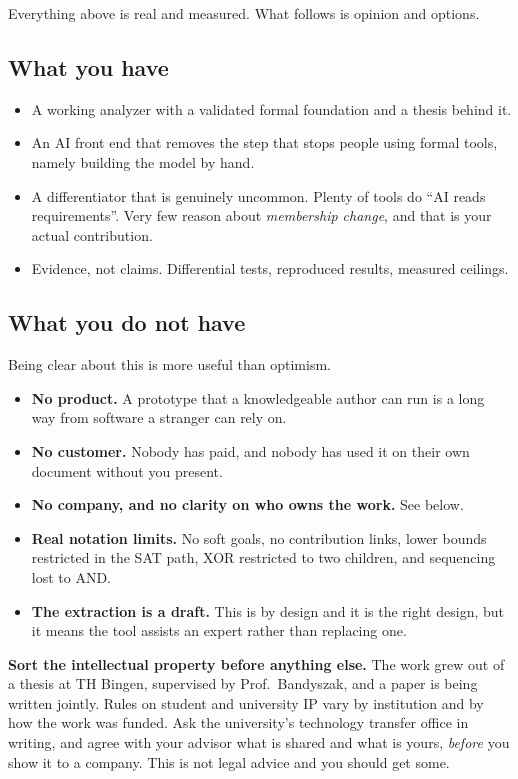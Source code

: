 \documentclass[11pt,a4paper]{article}
\begin{document}
Everything above is real and measured. What follows is opinion and options.

\subsection{What you have}

\begin{itemize}
\item A working analyzer with a validated formal foundation and a thesis behind it.
\item An AI front end that removes the step that stops people using formal tools, namely
      building the model by hand.
\item A differentiator that is genuinely uncommon. Plenty of tools do ``AI reads
      requirements''. Very few reason about \emph{membership change}, and that is your
      actual contribution.
\item Evidence, not claims. Differential tests, reproduced results, measured ceilings.
\end{itemize}

\subsection{What you do not have}

Being clear about this is more useful than optimism.

\begin{itemize}
\item \textbf{No product.} A prototype that a knowledgeable author can run is a long way
      from software a stranger can rely on.
\item \textbf{No customer.} Nobody has paid, and nobody has used it on their own
      document without you present.
\item \textbf{No company, and no clarity on who owns the work.} See below.
\item \textbf{Real notation limits.} No soft goals, no contribution links, lower bounds
      restricted in the SAT path, XOR restricted to two children, and sequencing lost
      to AND.
\item \textbf{The extraction is a draft.} This is by design and it is the right design,
      but it means the tool assists an expert rather than replacing one.
\end{itemize}

\begin{warnbox}
\textbf{Sort the intellectual property before anything else.} The work grew out of a
thesis at TH Bingen, supervised by Prof.\ Bandyszak, and a paper is being written jointly.
Rules on student and university IP vary by institution and by how the work was funded.
Ask the university's technology transfer office in writing, and agree with your advisor
what is shared and what is yours, \emph{before} you show it to a company. This is not
legal advice and you should get some.
\end{warnbox}
\end{document}
